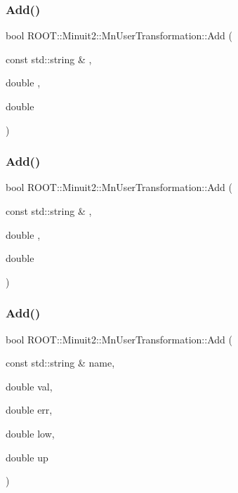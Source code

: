 \subsubsection{\texorpdfstring{Add()}{Add()}\hspace{0.1cm}{\footnotesize\ttfamily [2/9]}}
{\footnotesize\ttfamily bool R\+O\+O\+T\+::\+Minuit2\+::\+Mn\+User\+Transformation\+::\+Add (\begin{DoxyParamCaption}\item[{const std\+::string \&}]{,  }\item[{double}]{,  }\item[{double}]{ }\end{DoxyParamCaption})}

\mbox{\label{classROOT_1_1Minuit2_1_1MnUserTransformation_a2ddcd7b0cc5234b386407d7a76db1720}} 
\subsubsection{\texorpdfstring{Add()}{Add()}\hspace{0.1cm}{\footnotesize\ttfamily [3/9]}}
{\footnotesize\ttfamily bool R\+O\+O\+T\+::\+Minuit2\+::\+Mn\+User\+Transformation\+::\+Add (\begin{DoxyParamCaption}\item[{const std\+::string \&}]{,  }\item[{double}]{,  }\item[{double}]{ }\end{DoxyParamCaption})}

\mbox{\label{classROOT_1_1Minuit2_1_1MnUserTransformation_a173dea97b7be768e54b669c53b92c2dc}} 
\subsubsection{\texorpdfstring{Add()}{Add()}\hspace{0.1cm}{\footnotesize\ttfamily [4/9]}}
{\footnotesize\ttfamily bool R\+O\+O\+T\+::\+Minuit2\+::\+Mn\+User\+Transformation\+::\+Add (\begin{DoxyParamCaption}\item[{const std\+::string \&}]{name,  }\item[{double}]{val,  }\item[{double}]{err,  }\item[{double}]{low,  }\item[{double}]{up }\end{DoxyParamCaption})}


